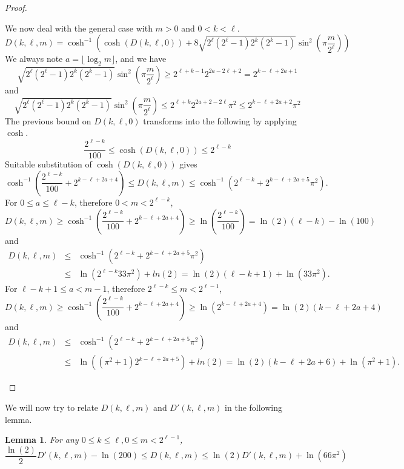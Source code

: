 \documentclass[11pt]{article}
\newtheorem{lem}{Lemma}
\begin{document}
\begin{proof}
\begin{enumerate}
We now deal with the general case with $m > 0$ and $0 < k < \ell$.
\[ D(k, \ell, m) = \cosh^{-1}(\cosh(D(k, \ell, 0)) + 8\sqrt{2^{\ell}(2^{\ell}-1)2^{k}(2^{k}-1)}\sin^{2}(\pi \frac{m}{2^{\ell}})) \]
We always note $a = \lfloor \log_2 m \rfloor$, and we have
\[ \sqrt{2^{\ell}(2^{\ell}-1)2^{k}(2^{k}-1)}\sin^{2}(\pi \frac{m}{2^{\ell}}) \geq 2^{\ell + k - 1} 2^{2a - 2\ell +2} = 2^{k - \ell + 2a + 1} \]
and
\[ \sqrt{2^{\ell}(2^{\ell}-1)2^{k}(2^{k}-1)}\sin^{2}(\pi \frac{m}{2^{\ell}}) \leq 2^{\ell + k} 2^{2a + 2 - 2\ell} \pi^{2} \leq 2^{k - \ell + 2a + 2} \pi^{2} \]
The previous bound on $D(k, \ell, 0)$ transforms into the following by applying $\cosh$.
\[ \frac{2^{\ell - k}}{100} \leq \cosh(D(k, \ell, 0)) \leq 2^{\ell - k} \]
Suitable substitution of $\cosh(D(k, \ell, 0))$ gives
\[ \cosh^{-1}(\frac{2^{\ell - k}}{100} + 2^{k - \ell + 2a + 4}) \leq D(k, \ell, m) \leq \cosh^{-1}(2^{\ell - k} + 2^{k - \ell + 2a + 5} \pi^{2}). \]
For $0 \leq a \leq \ell - k$, therefore $0 < m < 2^{\ell-k}$,
\[ D(k, \ell, m) \geq \cosh^{-1}(\frac{2^{\ell - k}}{100} + 2^{k - \ell + 2a + 4}) \geq \ln(\frac{2^{\ell - k}}{100}) = \ln(2)(\ell - k) - \ln(100) \]
and
\begin{eqnarray*}
D(k, \ell, m) & \leq & \cosh^{-1}(2^{\ell - k} + 2^{k - \ell + 2a + 5} \pi^{2}) \\
& \leq & \ln(2^{\ell - k} 33 \pi^{2}) + ln(2) = \ln(2)(\ell - k + 1) + \ln(33 \pi^{2}).
\end{eqnarray*}
For $\ell - k + 1 \leq a < m - 1$, therefore $2^{\ell-k} \leq m < 2^{\ell - 1}$,
\[ D(k, \ell, m) \geq \cosh^{-1}(\frac{2^{\ell - k}}{100} + 2^{k - \ell + 2a + 4}) \geq \ln(2^{k - \ell + 2a + 4}) = \ln(2)(k - \ell + 2a + 4) \]
and
\begin{eqnarray*}
D(k, \ell, m) & \leq & \cosh^{-1}(2^{\ell - k} + 2^{k - \ell + 2a + 5} \pi^{2}) \\
& \leq & \ln((\pi^{2} + 1)2^{k - \ell + 2a + 5}) + ln(2) = \ln(2)(k - \ell + 2a + 6) + \ln(\pi^{2} + 1).
\end{eqnarray*}
\end{enumerate}
\end{proof}

We will now try to relate $D(k,\ell,m)$ and $D'(k,\ell,m)$ in the following lemma.

\begin{lem}\label{lem:bound-of-two-distances}
For any $0 \leq k \leq \ell, 0 \leq m < 2^{\ell - 1}$,
\[ \frac{\ln(2)}{2}D'(k,\ell,m) - \ln(200) \leq D(k,\ell,m) \leq \ln(2)D'(k,\ell,m) + \ln(66 \pi^{2}) \]
\end{lem}
\end{document}
